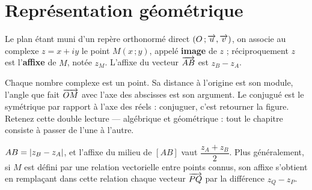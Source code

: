 \section{Représentation géométrique}

\begin{definition}[affixe]
Le plan étant muni d'un repère orthonormé direct $(O\,;\overrightarrow{u},\overrightarrow{v})$, on
associe au complexe $z = x+iy$ le point $M(x\,;y)$, appelé \textbf{image} de
$z$ ; réciproquement $z$ est l'\textbf{affixe} de $M$, notée $z_{M}$. L'affixe
du vecteur $\overrightarrow{AB}$ est $z_{B}-z_{A}$.
\end{definition}

\begin{visualisation}
\begin{center}
\end{center}

Chaque nombre complexe est un point. Sa distance à l'origine est son module,
l'angle que fait $\overrightarrow{OM}$ avec l'axe des abscisses est son argument. Le
conjugué est le symétrique par rapport à l'axe des réels : conjuguer, c'est
retourner la figure. Retenez cette double lecture — algébrique et
géométrique : tout le chapitre consiste à passer de l'une à l'autre.
\end{visualisation}

\begin{propriete}
$AB = \left|z_{B}-z_{A}\right|$, et l'affixe du milieu de $[AB]$ vaut
$\dfrac{z_{A}+z_{B}}{2}$. Plus généralement, si $M$ est défini par une
relation vectorielle entre points connus, son affixe s'obtient en remplaçant
dans cette relation chaque vecteur $\overrightarrow{PQ}$ par la différence
$z_{Q}-z_{P}$.
\end{propriete}

